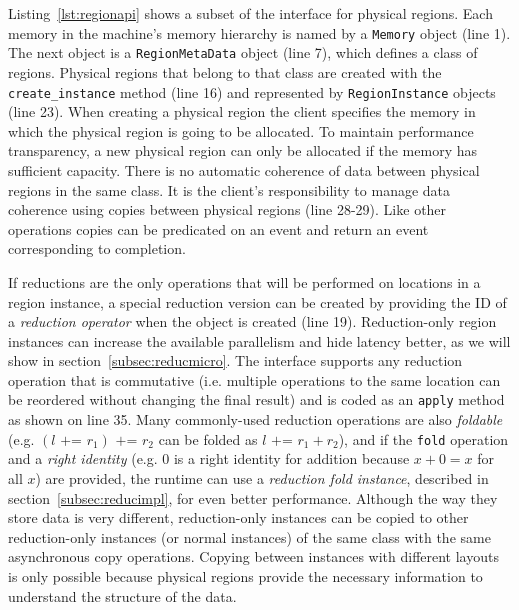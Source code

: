 Listing~\ref{lst:regionapi} shows a subset of the interface for physical regions.  
Each memory in the machine's memory hierarchy is named by a {\tt Memory} object (line 1).
The next object is a {\tt RegionMetaData} object (line 7), which defines a class of
regions.  Physical regions that belong to that class are created with the {\tt create\_instance}
method (line 16) and represented by {\tt RegionInstance} objects (line 23).  When creating a physical
region the client specifies the memory in which the physical region is going
to be allocated.  To maintain performance transparency, a new physical region can only be allocated
if the memory has sufficient capacity.
There is no automatic coherence of data between physical regions in the
same class.  It is the client's responsibility to manage data coherence using copies
between physical regions (line 28-29).  Like other operations copies can be
predicated on an event and return an event corresponding to completion.

If reductions are the only operations that will be performed on locations in a region instance,
a special reduction version can be created by providing the ID of a {\em reduction operator}
when the object is created (line 19).  Reduction-only region instances can 
increase the available parallelism and hide latency better, as we will show in 
section~\ref{subsec:reducmicro}.  The interface supports any reduction operation that
is commutative (i.e. multiple operations to the same location can be reordered without 
changing the final result) and is coded as an {\tt apply} method as shown on line 35.
Many commonly-used reduction operations are also {\em foldable} (e.g. $(l \text{ += } r_1) \text{ += } r_2$ can
be folded as $l \text{ += } r_1 + r_2$), and if the {\tt fold} operation and a {\em right identity}
(e.g. $0$ is a right identity for addition because $x + 0 = x$ for all $x$) are provided,
the runtime can use a {\em reduction fold instance}, described in section~\ref{subsec:reducimpl},
for even better performance.  Although the way they store data is very different,
reduction-only instances can be copied to other reduction-only instances (or normal 
instances) of the same class with the same asynchronous copy operations.  Copying between
instances with different layouts is only possible because physical regions provide 
the necessary information to understand the structure of the data.

